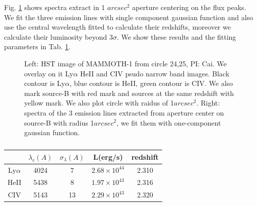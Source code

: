 \documentclass[../Results.tex]{subfiles}
\begin{document}
	Fig. \ref{overlayspec} shows spectra extract in 1 $arcsec^{2}$ aperture centering on the flux peaks. We fit the three emission lines with single component gaussian function and also use the central wavelength fitted to calculate their redshifts, moreover we calculate their luminosity beyond $3\sigma$. We show these results and the fitting parameters in Tab. \ref{fit_L}. 
	\begin{figure}
		\centering
		\label{overlayspec}
		\caption{Left: HST image of MAMMOTH-1 from circle 24,25, PI: Cai. We overlay on it Ly$\alpha$ HeII and CIV psudo narrow band images. Black contour is Ly$\alpha$, blue contour is HeII, green contour is CIV. We also mark source-B with red mark and sources at the same redshift with yellow mark. We also plot circle with raidus of 1$arcsec^{2}$. Right: spectra of the 3 emission lines extracted from aperture center on source-B with radius 1$arcsec^{2}$, we fit them with one-component gaussian function.}
	\end{figure}
	\begin{table}[htp]
	\begin{center}
		\begin{tabular}{ccccc}
\hline
\hline
& $\lambda_{c}(A)$ & $\sigma_{\lambda}(A)$ & L(erg/s) & redshift \\ \hline
Ly$\alpha$ &   4024  &     7  &   $2.68 \times 10^{44}$ & 2.310        \\
HeII       &   5438  &     8  &   $1.97 \times 10^{43}$ & 2.316        \\
CIV        &   5143  &     13 &   $2.29 \times 10^{43}$ & 2.320        \\ \hline
\end{tabular}
\end{center}
	\caption{}
	\label{fit_L}
	\end{table}
\end{document}
